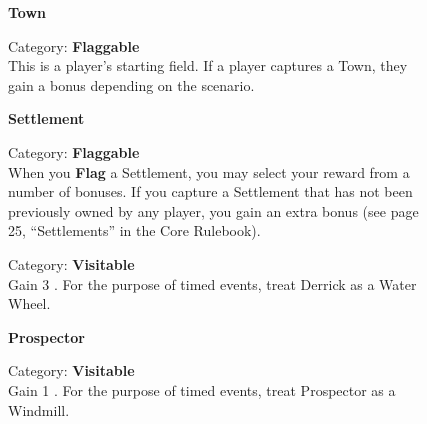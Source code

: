
\begin{figure}[H]
  \begin{minipage}[t]{0.47\textwidth}
    \vspace{0pt}
    \centering
    \textbf{Town}\par
    \caption{\small Category: \textbf{Flaggable}\\
      This is a player’s starting field.
      If a player captures a Town, they gain a bonus depending on the scenario.}
  \end{minipage}\hfill
  \begin{minipage}[t]{0.47\textwidth}
    \vspace{0pt}
    \centering
    \captionsetup{singlelinecheck=off}
    \phantom{j}\textbf{Settlement}\par
    \caption{\small Category: \textbf{Flaggable}\\
      When you \textbf{Flag} a Settlement, you may select your reward from a number of bonuses.
      If you capture a Settlement that has not been previously owned by any player, you gain an extra bonus (see page 25, “Settlements” in the Core Rulebook).}
  \end{minipage}
\end{figure}

\begin{figure}[H]
  \begin{minipage}[t]{0.47\textwidth}
    \vspace{0pt}
    \centering
    \par
    \caption{\small Category: \textbf{Visitable}\\
      Gain 3 .
      For the purpose of timed events, treat Derrick as a Water Wheel.}
  \end{minipage}\hfill
  \begin{minipage}[t]{0.47\textwidth}
    \vspace{0pt}
    \centering
    \phantom{j}\textbf{Prospector}\par
    \caption{\small Category: \textbf{Visitable}\\
      Gain 1 .
      For the purpose of timed events, treat Prospector as a Windmill.}
  \end{minipage}
\end{figure}

